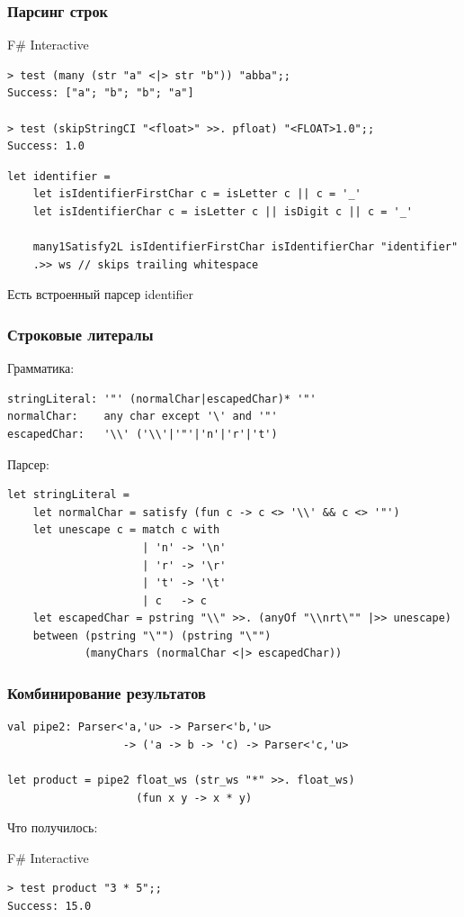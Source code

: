 \documentclass[xetex,mathserif,serif]{beamer}
\begin{document}
	\begin{frame}[fragile]
		\frametitle{Парсинг строк}
		\begin{alertblock}{F\# Interactive}
			\begin{verbatim}
> test (many (str "a" <|> str "b")) "abba";;
Success: ["a"; "b"; "b"; "a"]

> test (skipStringCI "<float>" >>. pfloat) "<FLOAT>1.0";;
Success: 1.0
			\end{verbatim}
		\end{alertblock}
		\begin{verbatim}
let identifier =
    let isIdentifierFirstChar c = isLetter c || c = '_'
    let isIdentifierChar c = isLetter c || isDigit c || c = '_'

    many1Satisfy2L isIdentifierFirstChar isIdentifierChar "identifier"
    .>> ws // skips trailing whitespace
		\end{verbatim}
		Есть встроенный парсер identifier
	\end{frame}

	\begin{frame}[fragile]
		\frametitle{Строковые литералы}
		\begin{small}
			Грамматика:
			\begin{verbatim}
stringLiteral: '"' (normalChar|escapedChar)* '"'
normalChar:    any char except '\' and '"'
escapedChar:   '\\' ('\\'|'"'|'n'|'r'|'t')
			\end{verbatim}
			Парсер:
			\begin{verbatim}
let stringLiteral =
    let normalChar = satisfy (fun c -> c <> '\\' && c <> '"')
    let unescape c = match c with
                     | 'n' -> '\n'
                     | 'r' -> '\r'
                     | 't' -> '\t'
                     | c   -> c
    let escapedChar = pstring "\\" >>. (anyOf "\\nrt\"" |>> unescape)
    between (pstring "\"") (pstring "\"")
            (manyChars (normalChar <|> escapedChar))
			\end{verbatim}
		\end{small}
	\end{frame}

	\begin{frame}[fragile]
		\frametitle{Комбинирование результатов}
		\begin{verbatim}
val pipe2: Parser<'a,'u> -> Parser<'b,'u> 
                  -> ('a -> b -> 'c) -> Parser<'c,'u>

let product = pipe2 float_ws (str_ws "*" >>. float_ws)
                    (fun x y -> x * y)
		\end{verbatim}
		Что получилось:
		\begin{alertblock}{F\# Interactive}
			\begin{verbatim}
> test product "3 * 5";;
Success: 15.0
			\end{verbatim}
		\end{alertblock}
	\end{frame}
\end{document}
